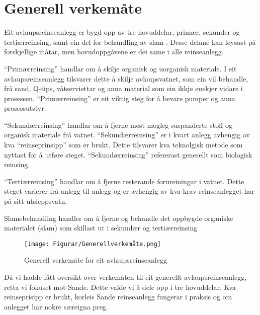 \section{Generell verkemåte}

Eit avlaupsreinseanlegg er bygd opp av tre hovuddelar, primær, sekunder og tertiærreinsing,
samt ein del for behandling av slam \citep{Regjeriga}.
Desse delane kan løysast på forskjellige måtar, men hovudoppgåvene er dei same
i alle reinseanlegg.

``Primærreinsing'' handlar om å skilje organisk og uorganisk materiale.
I eit avlaupsreinseanlegg tilsvarer dette å skilje avlaupsvatnet, 
som ein vil behandle, frå sand, Q-tips, våtserviettar og anna material som ein ikkje ønskjer vidare i prosessen.\newline
``Primærreinsing'' er eit viktig steg for å bevare pumper og anna prosessutstyr.

``Sekundærreinsing'' handlar om å fjerne mest mogleg suspanderte stoff og organisk materiale frå vatnet.
``Sekundærreinsing'' er i kvart anlegg avhengig av kva ``reinseprinsipp'' som er brukt. 
Dette tilsvarer kva teknolgisk metode som nyttast for å utføre steget.
``Sekundærreinsing'' refererast generellt som biologisk reinsing.

``Tertiærreinsing'' handlar om å fjerne resterande forureiningar i vatnet.
Dette steget varierer frå anlegg til anlegg og er
avhengig av kva krav reinseanlegget har på sitt utsleppsvatn.

Slamebehandling handler om å fjerne og behandle det oppbygde organiske materialet (slam)
som skillast ut i sekundær og tertiærreinsing 

\begin{figure}[htbp]
    \centering
    \texttt{[image: Figurar/Generellverkemåte.png]}
    \caption{Generell verkemåte for eit avlaupsreinseanlegg}\label{fig:GenerellVerkemåte}
\end{figure}

Då vi hadde fått oversikt over verkemåten til eit generellt avlaupsreinseanlegg, retta vi fokuset mot Sande.
Dette valde vi å dele opp i tre hovuddelar. Kva reinseprisipp er brukt, korleis Sande reinseanlegg
fungerar i praksis og om anlegget har nokre særeigna preg.
